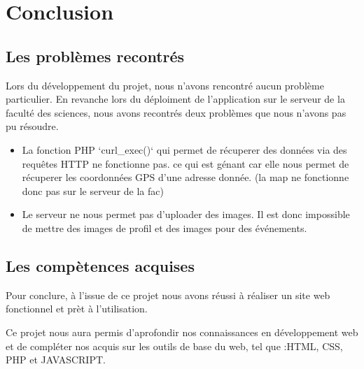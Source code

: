 \documentclass[oneside,11pt,a4paper]{article}
\begin{document}
\section{Conclusion}

\subsection{Les problèmes recontrés}

Lors du développement du projet, nous n'avons rencontré aucun problème particulier. En revanche lors du déploiment de l'application sur le serveur de la faculté des sciences, nous avons recontrés deux problèmes que nous n'avons pas pu résoudre.

\begin{itemize}
	\item La fonction PHP `curl\_exec()` qui permet de récuperer des données via des requêtes HTTP ne fonctionne pas. ce qui est génant car elle nous permet de récuperer les coordonnées GPS d'une adresse donnée. (la map ne fonctionne donc pas sur le serveur de la fac)
	\item Le serveur ne nous permet pas d'uploader des images. Il est donc impossible de mettre des images de profil et des images pour des événements.
\end{itemize}

\subsection{Les compètences acquises}

Pour conclure, à l’issue de ce projet nous avons réussi à réaliser un site web fonctionnel et prèt à l'utilisation. 

Ce projet nous aura permis d’aprofondir nos connaissances en développement web et de compléter nos acquis sur les outils de base du web, tel que :HTML, CSS, PHP et JAVASCRIPT.
\end{document}
